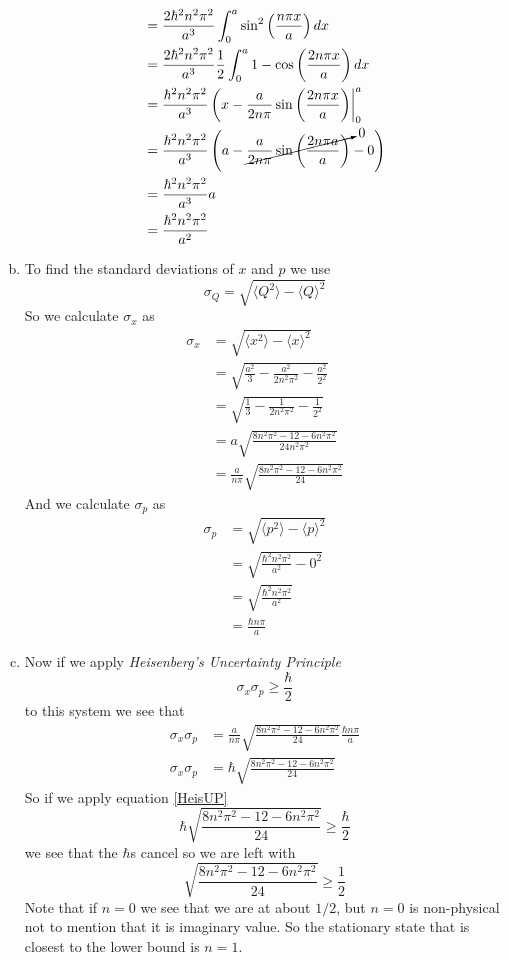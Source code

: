 \documentclass[11pt]{article}
\numberwithin{equation}{section}
\newcommand{\expt}[1]{\langle{#1}\rangle}
\begin{document}
\begin{enumerate}[(a)]
\begin{align*}
&= \frac{2\hbar^2 n^2\pi^2}{a^3}\int_{0}^{a}\sin^2\left(\frac{n\pi x}{a}\right)dx\\
&= \frac{2\hbar^2 n^2\pi^2}{a^3}\frac{1}{2}\int_{0}^{a}1-\cos\left(\frac{2n\pi x}{a}\right)dx\\
&= \frac{\hbar^2 n^2\pi^2}{a^3}\left(x-\frac{a}{2n\pi}\sin\left(\frac{2n\pi x}{a}\right)\right|_{0}^{a}\\
&= \frac{\hbar^2 n^2\pi^2}{a^3}\left(a-\cancelto{0}{\frac{a}{2n\pi}\sin\left(\frac{2n\pi a}{a} \right)}-0\right)\\
&= \frac{\hbar^2 n^2\pi^2}{a^3}a\\
&= \frac{\hbar^2 n^2\pi^2}{a^2}
\end{align*}

\item
To find the standard deviations of $x$ and $p$ we use 
\begin{equation}
\sigma_{Q} = \sqrt{\expt{Q^2}-\expt{Q}^2}
\label{stdev}
\end{equation}
So we calculate $\sigma_x$ as
\begin{align*}
\sigma_{x} &= \sqrt{\expt{x^2}-\expt{x}^2}\\
&= \sqrt{\frac{a^2}{3} - \frac{a^2}{2n^2\pi^2} - \frac{a^2}{2^2}}\\
&= \sqrt{\frac{1}{3} - \frac{1}{2n^2\pi^2} - \frac{1}{2^2}}\\
&= a\sqrt{\frac{8n^2\pi^2-12-6n^2\pi^2}{24n^2\pi^2}}\\
&= \frac{a}{n\pi}\sqrt{\frac{8n^2\pi^2-12-6n^2\pi^2}{24}}
\end{align*}
And we calculate $\sigma_p$ as
\begin{align*}
\sigma_{p} &= \sqrt{\expt{p^2}-\expt{p}^2}\\
&= \sqrt{\frac{\hbar^2 n^2\pi^2}{a^2}-0^2}\\
&= \sqrt{\frac{\hbar^2 n^2\pi^2}{a^2}}\\
&= \frac{\hbar n\pi}{a}
\end{align*}

\item
Now if we apply \emph{Heisenberg's Uncertainty Principle}
\begin{equation}
\sigma_x\sigma_p \ge\frac{\hbar}{2}
\label{HeisUP}
\end{equation}
to this system we see that
\begin{align*}
\sigma_x\sigma_p &= \frac{a}{n\pi}\sqrt{\frac{8n^2\pi^2-12-6n^2\pi^2}{24}} \frac{\hbar n\pi}{a}\\
\sigma_x\sigma_p &= \hbar\sqrt{\frac{8n^2\pi^2-12-6n^2\pi^2}{24}}
\end{align*}
So if we apply equation \ref{HeisUP} 
$$\hbar\sqrt{\frac{8n^2\pi^2-12-6n^2\pi^2}{24}} \ge \frac{\hbar}{2}$$
we see that the $\hbar$s cancel so we are left with
$$\sqrt{\frac{8n^2\pi^2-12-6n^2\pi^2}{24}} \ge \frac{1}{2}$$
Note that if $n=0$ we see that we are at about $1/2$, but $n=0$ is non-physical not to mention that it is imaginary value. So the stationary state that is closest to the lower bound is $n=1$.
\end{enumerate}
\end{document}
